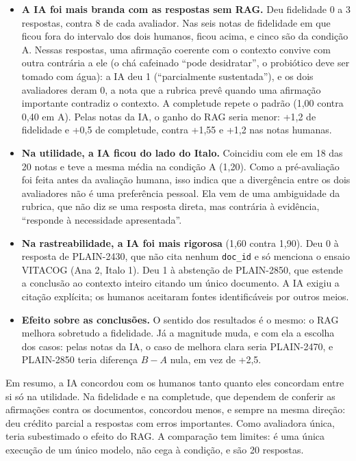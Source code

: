 \documentclass[11pt,a4paper]{article}
\newcommand{\cod}[1]{\texttt{#1}}
\begin{document}
\begin{itemize}
\item \textbf{A IA foi mais branda com as respostas sem RAG.} Deu fidelidade 0 a 3 respostas, contra 8 de cada avaliador. Nas seis notas de fidelidade em que ficou fora do intervalo dos dois humanos, ficou acima, e cinco são da condição A. Nessas respostas, uma afirmação coerente com o contexto convive com outra contrária a ele (o chá cafeinado ``pode desidratar'', o probiótico deve ser tomado com água): a IA deu 1 (``parcialmente sustentada''), e os dois avaliadores deram 0, a nota que a rubrica prevê quando uma afirmação importante contradiz o contexto. A completude repete o padrão (1,00 contra 0,40 em A). Pelas notas da IA, o ganho do RAG seria menor: +1,2 de fidelidade e +0,5 de completude, contra +1,55 e +1,2 nas notas humanas.
\item \textbf{Na utilidade, a IA ficou do lado do Italo.} Coincidiu com ele em 18 das 20 notas e teve a mesma média na condição A (1,20). Como a pré-avaliação foi feita antes da avaliação humana, isso indica que a divergência entre os dois avaliadores não é uma preferência pessoal. Ela vem de uma ambiguidade da rubrica, que não diz se uma resposta direta, mas contrária à evidência, ``responde à necessidade apresentada''.
\item \textbf{Na rastreabilidade, a IA foi mais rigorosa} (1,60 contra 1,90). Deu 0 à resposta de PLAIN-2430, que não cita nenhum \cod{doc\_id} e só menciona o ensaio VITACOG (Ana 2, Italo 1). Deu 1 à abstenção de PLAIN-2850, que estende a conclusão ao contexto inteiro citando um único documento. A IA exigiu a citação explícita; os humanos aceitaram fontes identificáveis por outros meios.
\item \textbf{Efeito sobre as conclusões.} O sentido dos resultados é o mesmo: o RAG melhora sobretudo a fidelidade. Já a magnitude muda, e com ela a escolha dos casos: pelas notas da IA, o caso de melhora clara seria PLAIN-2470, e PLAIN-2850 teria diferença $B-A$ nula, em vez de +2,5.
\end{itemize}

Em resumo, a IA concordou com os humanos tanto quanto eles concordam entre si só na utilidade. Na fidelidade e na completude, que dependem de conferir as afirmações contra os documentos, concordou menos, e sempre na mesma direção: deu crédito parcial a respostas com erros importantes. Como avaliadora única, teria subestimado o efeito do RAG. A comparação tem limites: é uma única execução de um único modelo, não cega à condição, e são 20 respostas.
\end{document}
